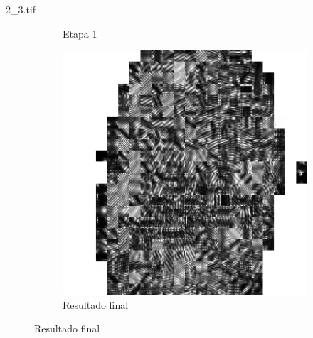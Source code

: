 \documentclass{beamer}
\begin{document}
\begin{frame}{2\_3.tif}
\begin{figure}
\begin{subfigure}[!ht]{0.32\textwidth}
                \caption{Etapa 1}
            \end{subfigure}
            \begin{subfigure}[!ht]{0.32\textwidth}
                \includegraphics[width=\columnwidth]{Fingerprints/2_3_final.jpg}
                \caption{Resultado final}
            \end{subfigure}
        \end{figure}
    \end{frame}
\end{document}
